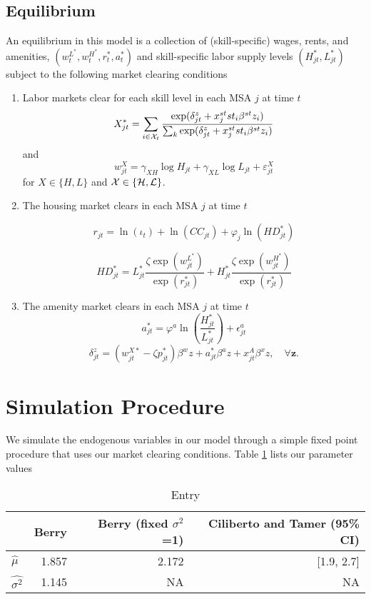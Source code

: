 \documentclass{article}
\begin{document}
\subsection{Equilibrium}
An equilibrium in this model is a collection of (skill-specific) wages, rents, and amenities, $(w_t^{L^*},w_t^{H^*},r_t^*,a_t^*)$ and skill-specific labor supply levels $(H_{jt}^*,L_{jt}^*)$ subject to the following market clearing conditions 
\begin{enumerate}
\item Labor markets clear for each skill level in each MSA $j$ at time $t$ 
$$ X_{jt}^*  = \sum_{i\in\mathcal{X}_t} \frac{\exp(\delta_{jt}^z + x_j^{st}st_i\beta^{st}z_i)}{\sum_{k} \exp(\delta_{jt}^z + x_j^{st}st_i\beta^{st}z_i)}$$
and 
$$w_{jt}^X = \gamma_{X H}\log H_{jt} + \gamma_{X L} \log L_{jt} + \varepsilon_{jt}^X$$
for $X \in \{H, L\}$ and $\mathcal{X} \in \{\mathcal{H}, \mathcal{L}\}$. 
\item The housing market clears in each MSA $j$ at time $t$

$$ r_{jt} = \ln(\iota_t) + \ln(CC_{jt}) + \varphi_j\ln (HD^*_{jt})$$

$$ HD_{jt}^* = L_{jt}^* \frac{\zeta \exp(w_{jt}^{L^*})}{\exp(r_{jt}^*)} + H_{jt}^* \frac{\zeta \exp(w_{jt}^{H^*})}{\exp(r_{jt}^*)}$$

\item The amenity market clears in each MSA $j$ at time $t$
$$a_{jt}^* = \varphi^a \ln\left(\frac{H_{jt}^*}{L_{jt}^*}\right) + \epsilon_{jt}^a$$
$$\delta_{jt}^z = (w^{X*}_{jt} - \zeta p_{jt}^*)\beta^w z + a_{jt}^* \beta^a z + x_{jt}^A\beta^xz, \quad \forall \bm{z}.$$
\end{enumerate}

\section{Simulation Procedure}

We simulate the endogenous variables in our model through a simple fixed point procedure that uses our market clearing conditions. Table \ref{tab:parameter_values} lists our parameter values 


\begin{table}[H]
\caption {Entry}
\begin{center}
 \label{tab:parameter_values} 
\begin{tabular}{l|rrr} & Berry & Berry (fixed $\sigma^2$ =1) & Ciliberto and Tamer (95\% CI)\\\hline
$\hat{\mu}$ & 1.857 & 2.172 & [1.9, 2.7] \\
$\hat{\sigma^2}$ & 1.145 & NA & NA \\
\end{tabular}
\end{center}
\end{table}
\end{document}
